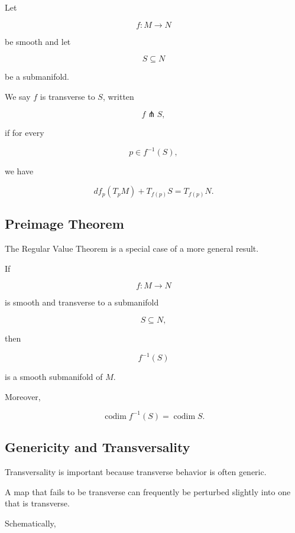 Let

\[
f:M\to N
\]

be smooth and let

\[
S\subseteq N
\]

be a submanifold.

We say \(f\) is transverse to \(S\), written

\[
\boxed{
f\pitchfork S,
}
\]

if for every

\[
p\in f^{-1}(S),
\]

we have

\[
\boxed{
df_p(T_pM)+T_{f(p)}S
=
T_{f(p)}N.
}
\]

\subsection{Preimage Theorem}
\label{subsec:preimage-theorem}

The Regular Value Theorem is a special case of a more general result.

\begin{theorem}
If

\[
f:M\to N
\]

is smooth and transverse to a submanifold

\[
S\subseteq N,
\]

then

\[
\boxed{
f^{-1}(S)
}
\]

is a smooth submanifold of \(M\).

Moreover,

\[
\boxed{
\operatorname{codim}f^{-1}(S)
=
\operatorname{codim}S.
}
\]
\end{theorem}

\subsection{Genericity and Transversality}
\label{subsec:genericity-transversality}

Transversality is important because transverse behavior is often generic.

A map that fails to be transverse can frequently be perturbed slightly into
one that is transverse.

Schematically,

